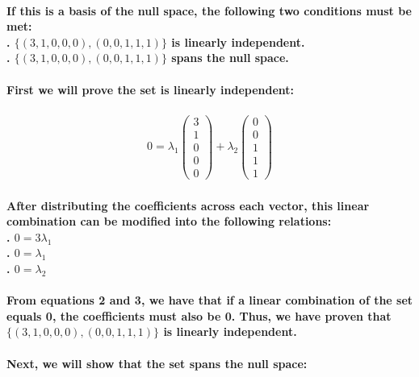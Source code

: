 \documentclass{article}
\begin{document}
\paragraph{\large
If this is a basis of the null space, the following two conditions must be met:
\\. $\{(3, 1, 0, 0, 0), (0, 0, 1, 1, 1)\}$ is linearly independent.
\\. $\{(3, 1, 0, 0, 0), (0, 0, 1, 1, 1)\}$ spans the null space.}

\paragraph{\large
First we will prove the set is linearly independent:}

\begin{align*}
0 = 
\lambda_1
\begin{pmatrix}
    3 \\ 1 \\ 0 \\ 0 \\ 0
\end{pmatrix}
+ \lambda_2
\begin{pmatrix}
    0 \\ 0 \\ 1 \\ 1 \\ 1
\end{pmatrix}
\end{align*}

\paragraph{\large
After distributing the coefficients across each vector, this linear combination can be modified into the following relations:
\\. $0 = 3\lambda_1$
\\. $0 = \lambda_1$
\\. $0 = \lambda_2$}

\paragraph{\large
From equations 2 and 3, we have that if a linear combination of the set equals 0, the coefficients must also be 0. Thus, we have proven that $\{(3, 1, 0, 0, 0), (0, 0, 1, 1, 1)\}$ is linearly independent.}

\paragraph{\large
Next, we will show that the set spans the null space:}
\end{document}
